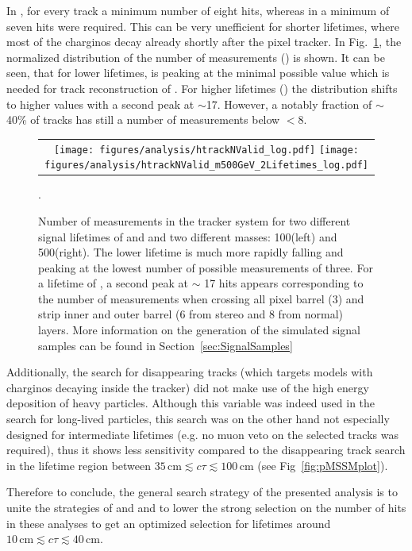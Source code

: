In \cite{bib:CMS:HSCP_8TeV}, for every track a minimum number of eight hits, whereas in \cite{bib:CMS:DT_8TeV} a minimum of seven hits were required. 
This can be very unefficient for shorter lifetimes, where most of the charginos decay already shortly after the pixel tracker.
In Fig.~\ref{fig:NHits_2Signal_noSelection_normalized}, the normalized distribution of the number of measurements (\nhits) is shown. 
It can be seen, that for lower lifetimes, \nhits is peaking at the minimal possible value which is needed for track reconstruction of .
For higher lifetimes (\cm) the distribution shifts to higher values with a second peak at \nhits$\sim$17.
However, a notably fraction of $\sim$ 40\% of tracks has still a number of measurements below \nhits$<$8. 
\begin{figure}[!bt]
  \centering 
  \begin{tabular}{c}
  \texttt{[image: figures/analysis/htrackNValid\_log.pdf]}
  \texttt{[image: figures/analysis/htrackNValid\_m500GeV\_2Lifetimes\_log.pdf]}
  \end{tabular}
  \caption{Number of measurements in the tracker system \nhits for two different signal lifetimes of \cm and \cm and two different masses: 100\gev (left) and 500\gev (right). 
           The lower lifetime is much more rapidly falling and peaking at the lowest number of possible measurements of three. 
           For a lifetime of \cm, a second peak at $\sim$ 17 hits appears corresponding to the number of measurements when crossing all pixel barrel (3) and strip inner and outer barrel (6 from stereo and 8 from normal) layers.
           More information on the generation of the simulated signal samples can be found in Section~\ref{sec:SignalSamples}}. 
  \label{fig:NHits_2Signal_noSelection_normalized}
\end{figure}

Additionally, the search for disappearing tracks (which targets models with charginos decaying inside the tracker) did not make use of the high energy deposition of heavy particles. 
Although this variable was indeed used in the search for long-lived particles, this search was on the other hand not especially designed for intermediate lifetimes (e.g. no muon veto on the selected tracks was required), 
thus it shows less sensitivity compared to the disappearing track search in the lifetime region between $35\,\text{cm} \lesssim c\tau \lesssim 100\,\text{cm}$ (see Fig~\ref{fig:pMSSMplot}).

Therefore to conclude, the general search strategy of the presented analysis is to unite the strategies of \cite{bib:CMS:HSCP_8TeV} and \cite{bib:CMS:DT_8TeV} and to lower the strong selection on the number of hits in these analyses 
to get an optimized selection for lifetimes around $10\,\text{cm} \lesssim c\tau \lesssim  40\,\text{cm}$.
